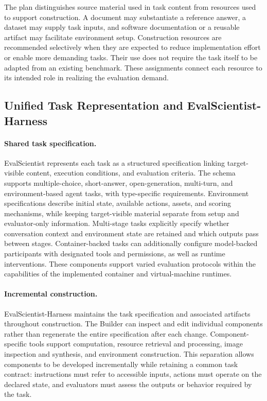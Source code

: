 \documentclass{article} %
\begin{document}
The plan distinguishes source material used in task content from resources used to support construction. A document may substantiate a reference answer, a dataset may supply task inputs, and software documentation or a reusable artifact may facilitate environment setup. Construction resources are recommended selectively when they are expected to reduce implementation effort or enable more demanding tasks. Their use does not require the task itself to be adapted from an existing benchmark. These assignments connect each resource to its intended role in realizing the evaluation demand.

\subsection{Unified Task Representation and EvalScientist-Harness}\label{sec:harness}

\paragraph{Shared task specification.}
EvalScientist represents each task as a structured specification linking target-visible content, execution conditions, and evaluation criteria. The schema supports multiple-choice, short-answer, open-generation, multi-turn, and environment-based agent tasks, with type-specific requirements. Environment specifications describe initial state, available actions, assets, and scoring mechanisms, while keeping target-visible material separate from setup and evaluator-only information. Multi-stage tasks explicitly specify whether conversation context and environment state are retained and which outputs pass between stages. Container-backed tasks can additionally configure model-backed participants with designated tools and permissions, as well as runtime interventions. These components support varied evaluation protocols within the capabilities of the implemented container and virtual-machine runtimes.

\paragraph{Incremental construction.}
EvalScientist-Harness maintains the task specification and associated artifacts throughout construction. The Builder can inspect and edit individual components rather than regenerate the entire specification after each change. Component-specific tools support computation, resource retrieval and processing, image inspection and synthesis, and environment construction. This separation allows components to be developed incrementally while retaining a common task contract: instructions must refer to accessible inputs, actions must operate on the declared state, and evaluators must assess the outputs or behavior required by the task.
\end{document}
